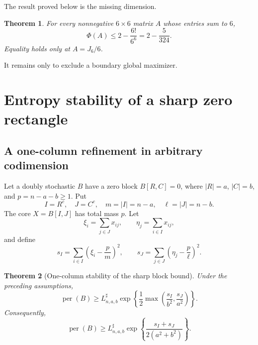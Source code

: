 \documentclass[11pt]{article}
\newtheorem{theorem}{Theorem}[section]
\theoremstyle{definition}
\newcommand{\per}{\operatorname{per}}
\begin{document}
The result proved below is the missing dimension.

\begin{theorem}\label{thm:n6}
For every nonnegative $6\times6$ matrix $A$ whose entries sum to $6$,
\[
 \Phi(A)\le 2-\frac{6!}{6^6}=2-\frac5{324}.
\]
Equality holds only at $A=J_6/6$.
\end{theorem}

It remains only to exclude a boundary global maximizer.

\section{Entropy stability of a sharp zero rectangle}

\subsection{A one-column refinement in arbitrary codimension}

Let a doubly stochastic $B$ have a zero block $B[R,C]=0$, where
$|R|=a$, $|C|=b$, and $p=n-a-b\ge1$.  Put
\[
 I=R^c,
 \quad J=C^c,
 \quad m=|I|=n-a,
 \quad \ell=|J|=n-b.
\]
The core $X=B[I,J]$ has total mass $p$.  Let
\[
 \xi_i=\sum_{j\in J}x_{ij},
 \qquad
 \eta_j=\sum_{i\in I}x_{ij},
\]
and define
\[
 s_I=\sum_{i\in I}\left(\xi_i-\frac pm\right)^2,
 \qquad
 s_J=\sum_{j\in J}\left(\eta_j-\frac p\ell\right)^2.
 \tag{2.1}\label{eq:sIJ}
\]

\begin{theorem}[One-column stability of the sharp block bound]
\label{thm:one-column-stability}
Under the preceding assumptions,
\[
 \per(B)\ge L^{\sharp}_{n,a,b}
 \exp\!\left\{
 \frac12\max\left(\frac{s_I}{b^2},\frac{s_J}{a^2}\right)
 \right\}.
 \tag{2.2}\label{eq:max-entropy}
\]
Consequently,
\[
 \per(B)\ge L^{\sharp}_{n,a,b}
 \exp\!\left\{\frac{s_I+s_J}{2(a^2+b^2)}\right\}.
 \tag{2.3}\label{eq:general-block-entropy}
\]
\end{theorem}
\end{document}
